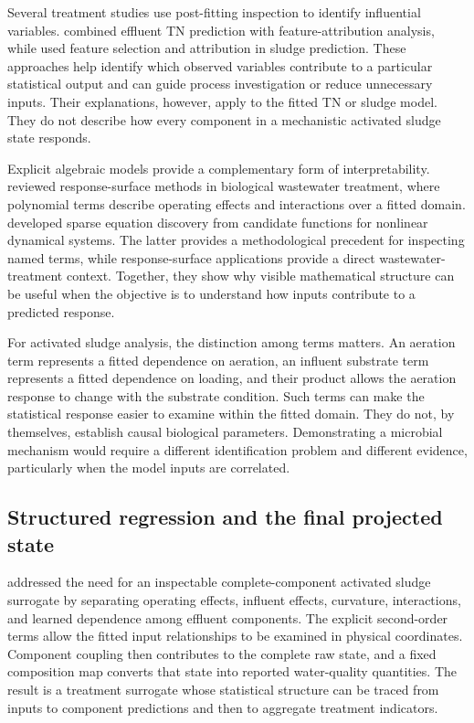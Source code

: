 Several treatment studies use post-fitting inspection to identify influential variables. \citet{Wang2025} combined effluent TN prediction with feature-attribution analysis, while \citet{Ekinci2023} used feature selection and attribution in sludge prediction. These approaches help identify which observed variables contribute to a particular statistical output and can guide process investigation or reduce unnecessary inputs. Their explanations, however, apply to the fitted TN or sludge model. They do not describe how every component in a mechanistic activated sludge state responds.

Explicit algebraic models provide a complementary form of interpretability. \citet{Nazlabadi2021} reviewed response-surface methods in biological wastewater treatment, where polynomial terms describe operating effects and interactions over a fitted domain. \citet{Brunton2016} developed sparse equation discovery from candidate functions for nonlinear dynamical systems. The latter provides a methodological precedent for inspecting named terms, while response-surface applications provide a direct wastewater-treatment context. Together, they show why visible mathematical structure can be useful when the objective is to understand how inputs contribute to a predicted response.

For activated sludge analysis, the distinction among terms matters. An aeration term represents a fitted dependence on aeration, an influent substrate term represents a fitted dependence on loading, and their product allows the aeration response to change with the substrate condition. Such terms can make the statistical response easier to examine within the fitted domain. They do not, by themselves, establish causal biological parameters. Demonstrating a microbial mechanism would require a different identification problem and different evidence, particularly when the model inputs are correlated.

\subsection{Structured regression and the final projected state}

\citet{Selerio2026} addressed the need for an inspectable complete-component activated sludge surrogate by separating operating effects, influent effects, curvature, interactions, and learned dependence among effluent components. The explicit second-order terms allow the fitted input relationships to be examined in physical coordinates. Component coupling then contributes to the complete raw state, and a fixed composition map converts that state into reported water-quality quantities. The result is a treatment surrogate whose statistical structure can be traced from inputs to component predictions and then to aggregate treatment indicators.

